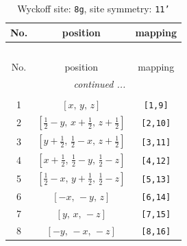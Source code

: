 \documentclass[fleqn,8pt]{jsarticle}
\begin{document}
\renewcommand{\arraystretch}{1.2}
\begin{longtable}{ccc}
\caption{Wyckoff site: {\tt 8g}, site symmetry: {\tt 11'}}
 \\
 \hline \hline
No. & position & mapping \\ \hline \endfirsthead

\multicolumn{2}{l}{\tablename\ \thetable{}} \\
 \hline \hline
No. & position & mapping \\ \hline \endhead

 \hline \hline
\multicolumn{2}{r}{\footnotesize\it continued ...} \\ \endfoot

 \hline \hline
\multicolumn{2}{r}{} \\ \endlastfoot

1 & $\left[ x,\, y,\, z \right]$ & {\tt [1,9]} \\ \hline
2 & $\left[ \frac{1}{2} - y,\, x + \frac{1}{2},\, z + \frac{1}{2} \right]$ & {\tt [2,10]} \\ \hline
3 & $\left[ y + \frac{1}{2},\, \frac{1}{2} - x,\, z + \frac{1}{2} \right]$ & {\tt [3,11]} \\ \hline
4 & $\left[ x + \frac{1}{2},\, \frac{1}{2} - y,\, \frac{1}{2} - z \right]$ & {\tt [4,12]} \\ \hline
5 & $\left[ \frac{1}{2} - x,\, y + \frac{1}{2},\, \frac{1}{2} - z \right]$ & {\tt [5,13]} \\ \hline
6 & $\left[ - x,\, - y,\, z \right]$ & {\tt [6,14]} \\ \hline
7 & $\left[ y,\, x,\, - z \right]$ & {\tt [7,15]} \\ \hline
8 & $\left[ - y,\, - x,\, - z \right]$ & {\tt [8,16]} \\
\end{longtable}
\end{document}
